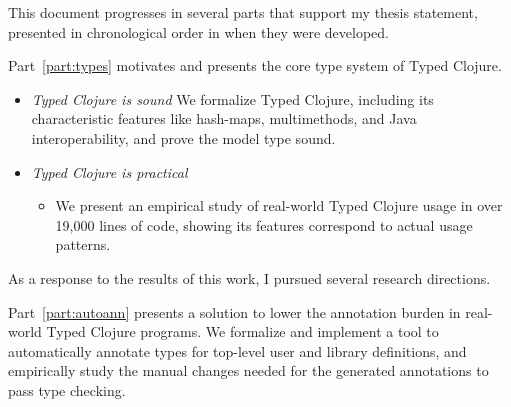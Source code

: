 This document progresses in several parts that support my thesis statement, presented in chronological order
in when they were developed.

Part~\ref{part:types} motivates and presents the core type system of Typed Clojure.

\begin{itemize}
  \item \emph{Typed Clojure is sound} We formalize Typed Clojure, including
    its characteristic features like hash-maps, multimethods, and Java interoperability,
    and prove the model type sound.
  \item \emph{Typed Clojure is practical} 
    \begin{itemize}
      \item We present an empirical study of real-world Typed Clojure usage
        in over 19,000 lines of code, showing its features correspond to actual usage patterns.
    \end{itemize}
\end{itemize}

As a response to the results of this work, I pursued several research directions.

Part~\ref{part:autoann} presents a solution to lower the annotation burden in real-world Typed Clojure programs.
We formalize and implement a tool to automatically annotate types for top-level
user and library definitions, and empirically study the manual changes needed for the generated annotations
to pass type checking.

